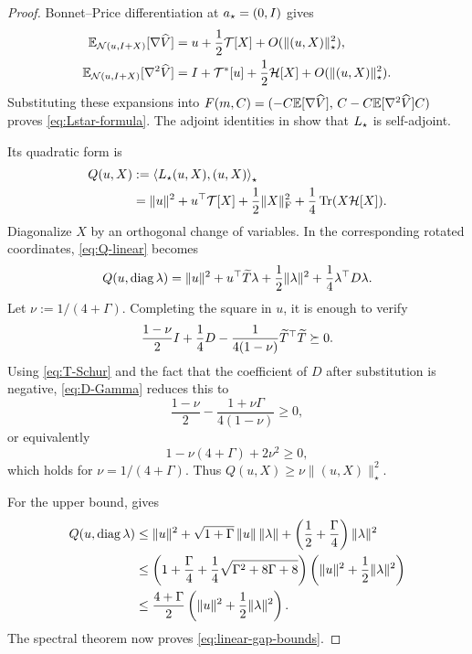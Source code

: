 \begin{proof}
Bonnet--Price differentiation at $a_\star=(0,I)$ gives
\[
\begin{aligned}
    \mathbb{E}_{\mathcal{N}(u,I+X)}[\nabla\widehat V]
    &=u+\frac12\mathcal T[X]+O(\|(u,X)\|_\star^2),\\
    \mathbb{E}_{\mathcal{N}(u,I+X)}[\nabla^2\widehat V]
    &=I+\mathcal T^*[u]+\frac12\mathcal H[X]+O(\|(u,X)\|_\star^2).
\end{aligned}
\]
Substituting these expansions into
$F(m,C)=(-C\mathbb{E}[\nabla\widehat V],\,C-C\mathbb{E}[\nabla^2\widehat V]C)$ proves
\eqref{eq:Lstar-formula}.  The adjoint identities in
 show that $L_\star$ is self-adjoint.

Its quadratic form is
\begin{equation}
\label{eq:Q-linear}
\begin{aligned}
    Q(u,X)
    &:=\left\langle L_\star(u,X),(u,X)\right\rangle_\star\\
    &=\|u\|^2+u^\top\mathcal T[X]
      +\frac12\|X\|_{\mathrm{F}}^2
      +\frac14\operatorname{Tr}(X\mathcal H[X]).
\end{aligned}
\end{equation}
Diagonalize $X$ by an orthogonal change of variables.  In the corresponding rotated
coordinates, \eqref{eq:Q-linear} becomes
\[
    Q(u,\operatorname{diag}\lambda)
    =\|u\|^2+u^\top\widetilde T\lambda
      +\frac12\|\lambda\|^2+\frac14\lambda^\top D\lambda.
\]
Let $\nu:=1/(4+\Gamma)$.  Completing the square in $u$, it is enough to verify
\[
    \frac{1-\nu}{2}I+\frac14D
      -\frac1{4(1-\nu)}\widetilde T^\top\widetilde T\succeq0.
\]
Using \eqref{eq:T-Schur} and the fact that the coefficient of $D$ after substitution is
negative, \eqref{eq:D-Gamma} reduces this to
\[
    \frac{1-\nu}{2}-\frac{1+\nu\Gamma}{4(1-\nu)}\geq0,
\]
or equivalently
\[
    1-\nu(4+\Gamma)+2\nu^2\geq0,
\]
which holds for $\nu=1/(4+\Gamma)$.  Thus
$Q(u,X)\geq\nu\|(u,X)\|_\star^2$.

For the upper bound,  gives
\[
\begin{aligned}
    Q(u,\operatorname{diag}\lambda)
    &\leq
    \|u\|^2+\sqrt{1+\Gamma}\,\|u\|\,\|\lambda\|
      +\left(\frac12+\frac\Gamma4\right)\|\lambda\|^2\\
    &\leq
    \left(1+\frac\Gamma4+\frac14\sqrt{\Gamma^2+8\Gamma+8}\right)
    \left(\|u\|^2+\frac12\|\lambda\|^2\right)\\
    &\leq
    \frac{4+\Gamma}{2}\left(\|u\|^2+\frac12\|\lambda\|^2\right).
\end{aligned}
\]
The spectral theorem now proves \eqref{eq:linear-gap-bounds}.
\end{proof}

